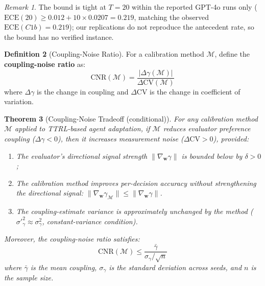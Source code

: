 \documentclass[11pt]{article}
\newcommand{\CV}{\ensuremath{\mathrm{CV}}}
\newcommand{\ECE}{\ensuremath{\mathrm{ECE}}}
\newtheorem{theorem}{Theorem}
\theoremstyle{definition}
\newtheorem{definition}[theorem]{Definition}
\theoremstyle{remark}
\newtheorem{remark}[theorem]{Remark}
\begin{document}
\begin{remark}
The bound is tight at $T{=}20$ within the reported GPT-4o runs only ($\ECE(20) \geq 0.012 + 10 \times 0.0207 = 0.219$, matching the observed $\ECE(C1b) = 0.219$); our replications do not reproduce the antecedent rate, so the bound has no verified instance.
\end{remark}

\begin{definition}[Coupling-Noise Ratio]
For a calibration method $\mathcal{M}$, define the \textbf{coupling-noise ratio} as:
\begin{equation}
    \text{CNR}(\mathcal{M}) = \frac{|\Delta\gamma(\mathcal{M})|}{\Delta\CV(\mathcal{M})}
\end{equation}
where $\Delta\gamma$ is the change in coupling and $\Delta\CV$ is the change in coefficient of variation.
\end{definition}

\begin{theorem}[Coupling-Noise Tradeoff (conditional)]\label{thm:tradeoff}
For any calibration method $\mathcal{M}$ applied to TTRL-based agent adaptation, if $\mathcal{M}$ reduces evaluator preference coupling ($\Delta\gamma < 0$), then it increases measurement noise ($\Delta\CV > 0$), provided:
\begin{enumerate}[leftmargin=*,nosep]
    \item The evaluator's directional signal strength $\|\nabla_{\mathbf{w}} \gamma\|$ is bounded below by $\delta > 0$;
    \item The calibration method improves per-decision accuracy without strengthening the directional signal: $\|\nabla_{\mathbf{w}} \gamma_{\mathcal{M}}\| \leq \|\nabla_{\mathbf{w}} \gamma\|$.
    \item The coupling-estimate variance is approximately unchanged by the method ($\sigma'^2_{\gamma} \approx \sigma^2_{\gamma}$, constant-variance condition).
\end{enumerate}
Moreover, the coupling-noise ratio satisfies:
\begin{equation}
    \text{CNR}(\mathcal{M}) \leq \frac{\bar{\gamma}}{\sigma_{\gamma} / \sqrt{n}}
\end{equation}
where $\bar{\gamma}$ is the mean coupling, $\sigma_{\gamma}$ is the standard deviation across seeds, and $n$ is the sample size.
\end{theorem}
\end{document}
